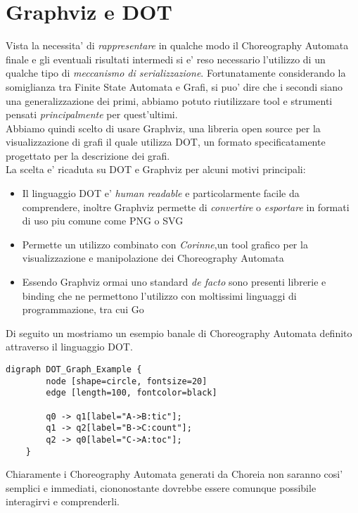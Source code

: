 \section{Graphviz e DOT}
Vista la necessita' di \emph{rappresentare} in qualche modo il Choreography Automata finale e gli eventuali risultati intermedi si e' reso necessario l'utilizzo di un qualche tipo di \emph{meccanismo di serializzazione}. Fortunatamente considerando la somiglianza tra Finite State Automata e Grafi, si puo' dire che i secondi siano una generalizzazione dei primi, abbiamo potuto riutilizzare tool e strumenti pensati \emph{principalmente} per quest'ultimi.\\
Abbiamo quindi scelto di usare Graphviz\cite{Graphviz_Wikipedia}, una libreria open source per la visualizzazione di grafi il quale utilizza DOT\cite{DOT_Wikipedia}, un formato specificatamente progettato per la descrizione dei grafi.\\
La scelta e' ricaduta su DOT e Graphviz per alcuni motivi principali:
\begin{itemize}
    \item Il linguaggio DOT e' \emph{human readable} e particolarmente facile da comprendere, inoltre Graphviz permette di \emph{convertire} o \emph{esportare} in formati di uso piu comune come PNG o SVG
    \item Permette un utilizzo combinato con \emph{Corinne}\cite{Corinne},un tool grafico per la visualizzazione e manipolazione dei Choreography Automata
    \item Essendo Graphviz ormai uno standard \emph{de facto} sono presenti librerie e binding che ne permettono l'utilizzo con moltissimi linguaggi di programmazione, tra cui Go
\end{itemize}
Di seguito un mostriamo un esempio banale di Choreography Automata definito attraverso il linguaggio DOT.
\begin{lstlisting}[caption=Rappresentazione in DOT dell'automa in figura \ref{fig:ChoreographyAutomata_Example}]
    digraph DOT_Graph_Example {
        node [shape=circle, fontsize=20]
        edge [length=100, fontcolor=black]
      
        q0 -> q1[label="A->B:tic"];
        q1 -> q2[label="B->C:count"];
        q2 -> q0[label="C->A:toc"];
    }
\end{lstlisting}
Chiaramente i Choreography Automata generati da Choreia non saranno cosi' semplici e immediati, ciononostante dovrebbe essere comunque possibile interagirvi e comprenderli.